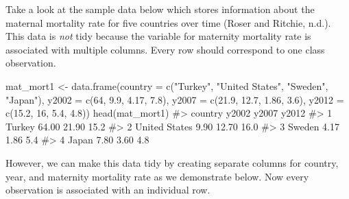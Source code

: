 \documentclass[
  letterpaper,
]{krantz}
\makeatletter
\newenvironment{Shaded}{\begin{snugshade}}{\end{snugshade}}
\newcommand{\AttributeTok}[1]{\textcolor[rgb]{0.40,0.45,0.13}{#1}}
\newcommand{\CommentTok}[1]{\textcolor[rgb]{0.37,0.37,0.37}{#1}}
\newcommand{\DecValTok}[1]{\textcolor[rgb]{0.68,0.00,0.00}{#1}}
\newcommand{\FloatTok}[1]{\textcolor[rgb]{0.68,0.00,0.00}{#1}}
\newcommand{\FunctionTok}[1]{\textcolor[rgb]{0.28,0.35,0.67}{#1}}
\newcommand{\NormalTok}[1]{\textcolor[rgb]{0.00,0.23,0.31}{#1}}
\newcommand{\OtherTok}[1]{\textcolor[rgb]{0.00,0.23,0.31}{#1}}
\newcommand{\StringTok}[1]{\textcolor[rgb]{0.13,0.47,0.30}{#1}}
\newenvironment{kframe}{%
\medskip{}
\setlength{\fboxsep}{.8em}
 \def\at@end@of@kframe{}%
 \ifinner\ifhmode%
  \def\at@end@of@kframe{\end{minipage}}%
  \begin{minipage}{\columnwidth}%
 \fi\fi%
 \def\FrameCommand##1{\hskip\@totalleftmargin \hskip-\fboxsep
 \colorbox{shadecolor}{##1}\hskip-\fboxsep
     \hskip-\linewidth \hskip-\@totalleftmargin \hskip\columnwidth}%
 \MakeFramed {\advance\hsize-\width
   \@totalleftmargin\z@ \linewidth\hsize
   \@setminipage}}%
 {\par\unskip\endMakeFramed%
 \at@end@of@kframe}
\renewenvironment{Shaded}{\begin{kframe}}{\end{kframe}}
\makeatother
\begin{document}
Take a look at the sample data below which stores information about the
maternal mortality rate for five countries over time (Roser and Ritchie,
n.d.). This data is \emph{not} tidy because the variable for maternity
mortality rate is associated with multiple columns. Every row should
correspond to one class observation.

\begin{Shaded}
\begin{Highlighting}[]
\NormalTok{mat\_mort1 }\OtherTok{\textless{}{-}} \FunctionTok{data.frame}\NormalTok{(}\AttributeTok{country =} \FunctionTok{c}\NormalTok{(}\StringTok{"Turkey"}\NormalTok{, }\StringTok{"United States"}\NormalTok{, }
                                    \StringTok{"Sweden"}\NormalTok{, }\StringTok{"Japan"}\NormalTok{),}
                       \AttributeTok{y2002 =} \FunctionTok{c}\NormalTok{(}\DecValTok{64}\NormalTok{, }\FloatTok{9.9}\NormalTok{, }\FloatTok{4.17}\NormalTok{, }\FloatTok{7.8}\NormalTok{),}
                       \AttributeTok{y2007 =} \FunctionTok{c}\NormalTok{(}\FloatTok{21.9}\NormalTok{, }\FloatTok{12.7}\NormalTok{, }\FloatTok{1.86}\NormalTok{, }\FloatTok{3.6}\NormalTok{),}
                       \AttributeTok{y2012 =} \FunctionTok{c}\NormalTok{(}\FloatTok{15.2}\NormalTok{, }\DecValTok{16}\NormalTok{, }\FloatTok{5.4}\NormalTok{, }\FloatTok{4.8}\NormalTok{))}
\FunctionTok{head}\NormalTok{(mat\_mort1)}
\CommentTok{\#\textgreater{}         country y2002 y2007 y2012}
\CommentTok{\#\textgreater{} 1        Turkey 64.00 21.90  15.2}
\CommentTok{\#\textgreater{} 2 United States  9.90 12.70  16.0}
\CommentTok{\#\textgreater{} 3        Sweden  4.17  1.86   5.4}
\CommentTok{\#\textgreater{} 4         Japan  7.80  3.60   4.8}
\end{Highlighting}
\end{Shaded}

However, we can make this data tidy by creating separate columns for
country, year, and maternity mortality rate as we demonstrate below. Now
every observation is associated with an individual row.
\end{document}
